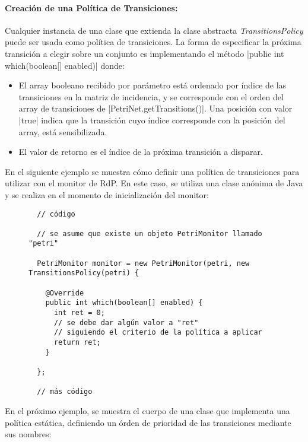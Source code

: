 \paragraph{Creación de una Política de Transiciones:}
Cualquier instancia de una clase que extienda la clase abstracta
\textit{TransitionsPolicy} puede ser usada como política de transiciones.
La forma de especificar la próxima transición a elegir sobre un conjunto es
implementando el método |public int which(boolean[] enabled)| donde:
\begin{itemize}
    \item El array booleano recibido por parámetro está ordenado por índice de
    las transiciones en la matriz de incidencia, y se corresponde con el orden
    del array de transiciones de |PetriNet.getTransitions()|. Una
    posición con valor |true| indica que la transición cuyo índice
    corresponde con la posición del array, está sensibilizada.
    \item El valor de retorno es el índice de la próxima transición a disparar.
\end{itemize}

En el siguiente ejemplo se muestra cómo definir una política de transiciones
para utilizar con el monitor de RdP. En este caso, se utiliza una clase anónima
de Java y se realiza en el momento de inicialización del monitor:

\begin{figure}[H]
\centering
\begin{verbatim}
  // código
  
  // se asume que existe un objeto PetriMonitor llamado "petri"
  
  PetriMonitor monitor = new PetriMonitor(petri, new TransitionsPolicy(petri) {
  
    @Override
    public int which(boolean[] enabled) {
      int ret = 0;
      // se debe dar algún valor a "ret"
      // siguiendo el criterio de la política a aplicar
      return ret;
    }
    
  };
  
  // más código
\end{verbatim}
\end{figure}

En el próximo ejemplo, se muestra el cuerpo de una clase que implementa una
política estática, definiendo un órden de prioridad de las transiciones mediante sus
nombres:

